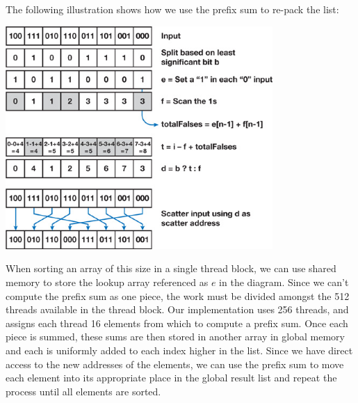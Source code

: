 \documentclass[12pt]{article}
\begin{document}
\newpage
The following illustration shows how we use the prefix sum to re-pack the list:

\begin{center}
\includegraphics[width=4in]{nvidia-stuff.jpg}
\end{center}

When sorting an array of this size in a single thread block, we can use shared memory to store the lookup array referenced as $e$ in the diagram.  
Since we can't compute the prefix sum as one piece, the work must be divided amongst the 512 threads available in the thread block.  
Our implementation uses 256 threads, and assigns each thread 16 elements from which to compute a prefix sum.
Once each piece is summed, these sums are then stored in another array in global memory and each is uniformly added to each index higher in the list.  
Since we have direct access to the new addresses of the elements, we can use the prefix sum to move each element into its appropriate place in the global result list and repeat the process until all elements are sorted.
\end{document}
